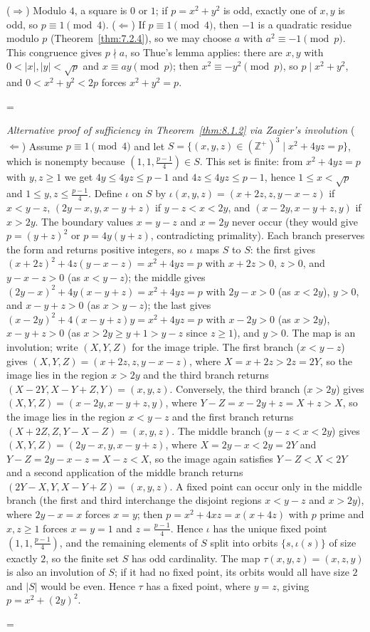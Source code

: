 \documentclass[11pt]{article}
\makeatletter
\theoremstyle{ntstyle}
\let\nt@closedisplay\]
\def\nt@guardedclose{\@ifnextchar\par{\nt@closeafterpar}{\@ifnextchar\end{\postdisplaypenalty\@M\nt@closedisplay}{\nt@closedisplay}}}
\def\nt@closeafterpar\par{\@ifnextchar\par{\nt@closeafterpar}{\@ifnextchar\end{\postdisplaypenalty\@M\nt@closedisplay\par}{\nt@closedisplay\par}}}
\renewenvironment{proof}[1][\proofname]{\par
  \pushQED{\qed}\normalfont\topsep\medskipamount\edef\nt@afterproof{\@endparpenalty=\the\@endparpenalty\relax}\@beginparpenalty\@M\@endparpenalty\@M\let\]\nt@guardedclose\trivlist\item[]\textit{#1\@addpunct{.}} \ignorespaces}{\ifvmode\addpenalty\@M\fi\popQED\nt@afterproof\endtrivlist\@endpefalse}
\newenvironment{altproof}[1][\proofname]{\begin{proof}[#1]\renewcommand{\qedsymbol}{}}{\end{proof}}
\makeatother
\begin{document}
\begin{proof} ($\Rightarrow$) Modulo $4$, a square is $0$
	or $1$; if $p = x^2 + y^2$ is odd, exactly one of $x, y$ is odd, so
	$p \equiv 1 \pmod{4}$. ($\Leftarrow$) If $p \equiv 1 \pmod{4}$, then
	$-1$ is a quadratic residue modulo $p$ (Theorem~\ref{thm:7.2.4}), so we may choose $a$ with $a^2
		\equiv -1 \pmod{p}$. This congruence gives $p\nmid a$, so Thue's
	lemma applies: there are $x, y$ with $0 < |x|,
		|y| < \sqrt{p}$ and $x \equiv a y \pmod{p}$; then $x^2 \equiv -y^2
		\pmod{p}$, so $p \mid x^2 + y^2$, and $0 < x^2 + y^2 < 2p$ forces $x^2
		+ y^2 = p$.

\end{proof}
\begin{altproof}[Alternative proof of sufficiency in Theorem~\ref{thm:8.1.2} via Zagier's involution] ($\Leftarrow$) Assume $p \equiv 1
		\pmod{4}$ and let $S = \{(x, y, z) \in (\mathbb{Z}^+)^3 \mid x^2 + 4yz =
		p\}$, which is nonempty because $(1, 1, \tfrac{p-1}{4}) \in S$. This set is finite:
	from $x^2+4yz=p$ with $y,z\ge1$ we get $4y\le 4yz\le p-1$ and
	$4z\le 4yz\le p-1$, hence $1\le x<\sqrt{p}$ and $1\le y,z\le\tfrac{p-1}{4}$. Define
	$\iota$ on $S$
	by $\iota(x, y, z) = (x + 2z, z, y - x - z)$ if $x < y - z$, $(2y -
		x, y, x - y + z)$ if $y - z < x < 2y$, and $(x - 2y, x - y + z, y)$ if $x
		> 2y$. The boundary values $x = y - z$ and $x = 2y$ never occur (they
	would give $p = (y+z)^2$ or $p = 4y(y+z)$, contradicting primality).
	Each branch preserves the form and returns positive integers, so
	$\iota$ maps $S$ to $S$: the first gives
	$(x+2z)^2+4z(y-x-z)=x^2+4yz=p$ with $x+2z>0$, $z>0$, and $y-x-z>0$
	(as $x<y-z$); the middle gives $(2y-x)^2+4y(x-y+z)=x^2+4yz=p$ with
	$2y-x>0$ (as $x<2y$), $y>0$, and $x-y+z>0$ (as $x>y-z$); the last
	gives $(x-2y)^2+4(x-y+z)y=x^2+4yz=p$ with $x-2y>0$ (as $x>2y$),
	$x-y+z>0$ (as $x>2y\ge y+1>y-z$ since $z\ge1$), and $y>0$.
	  The map is an involution; write $(X,Y,Z)$ for the image triple.
	  The first branch ($x<y-z$) gives $(X,Y,Z)=(x+2z,z,y-x-z)$, where $X=x+2z>2z=2Y$, so the image lies in the region $x>2y$ and the third branch returns $(X-2Y,X-Y+Z,Y)=(x,y,z)$.
	  Conversely, the third branch ($x>2y$) gives $(X,Y,Z)=(x-2y,x-y+z,y)$, where $Y-Z=x-2y+z=X+z>X$, so the image lies in the region $x<y-z$ and the first branch returns $(X+2Z,Z,Y-X-Z)=(x,y,z)$.
	  The middle branch ($y-z<x<2y$) gives $(X,Y,Z)=(2y-x,y,x-y+z)$, where $X=2y-x<2y=2Y$ and $Y-Z=2y-x-z=X-z<X$, so the image again satisfies $Y-Z<X<2Y$ and a second application of the middle branch returns $(2Y-X,Y,X-Y+Z)=(x,y,z)$.
	  A fixed point can occur only in the middle branch (the first and third interchange the disjoint regions $x<y-z$ and $x>2y$), where $2y-x=x$ forces $x=y$; then $p=x^2+4xz=x(x+4z)$ with $p$ prime and $x,z\ge1$ forces $x=y=1$ and $z=\tfrac{p-1}{4}$.
	  Hence $\iota$ has the unique fixed point $(1,1,\tfrac{p-1}{4})$, and the remaining elements of $S$ split into orbits $\{s,\iota(s)\}$ of size exactly $2$, so the finite set $S$ has odd cardinality.
	  The map $\tau(x, y, z) = (x, z, y)$ is also an involution of $S$; if it had no fixed point, its orbits would all have size $2$ and $|S|$ would be even.
	  Hence $\tau$ has a
	fixed point, where $y = z$, giving $p = x^2 + (2y)^2$.

\end{altproof}
\end{document}
